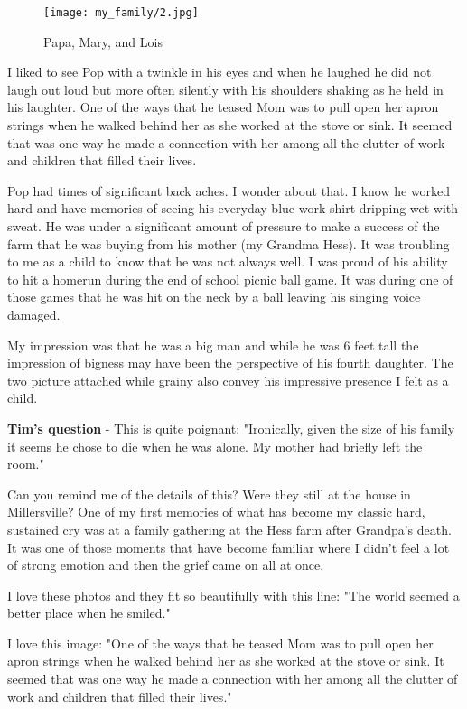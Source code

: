 \begin{figure}
\centering
\texttt{[image: my\_family/2.jpg]}
\caption{Papa, Mary, and Lois}
\end{figure}
I liked to see Pop with a twinkle in his eyes and when he laughed he did not laugh out loud but more often silently with his shoulders shaking as he held in his laughter.
One of the ways that he teased Mom was to pull open her apron strings when he walked behind her as she worked at the stove or sink.
It seemed that was one way he made a connection with her among all the clutter of work and children that filled their lives.

Pop had times of significant back aches.
I wonder about that.
I know he worked hard and have memories of seeing his everyday blue work shirt dripping wet with sweat.
He was under a significant amount of pressure to make a success of the farm that he was buying from his mother (my Grandma Hess).
It was troubling to me as a child to know that he was not always well.
I was proud of his ability to hit a homerun during the end of school picnic ball game.
It was during one of those games that he was hit on the neck by a ball leaving his singing voice damaged.

My impression was that he was a big man and while he was 6 feet tall the impression of bigness may have been the perspective of his fourth daughter.
The two picture attached while grainy also convey his impressive presence I felt as a child.

\textbf{Tim's question} - This is quite poignant: "Ironically, given the size of his family it seems he chose to die when he was alone.
My mother had briefly left the room."

Can you remind me of the details of this? Were they still at the house in Millersville? One of my first memories of what has become my classic hard, sustained cry was at a family gathering at the Hess farm after Grandpa's death.
It was one of those moments that have become familiar where I didn't feel a lot of strong emotion and then the grief came on all at once.

I love these photos and they fit so beautifully with this line: "The world seemed a better place when he smiled."

I love this image: "One of the ways that he teased Mom was to pull open her apron strings when he walked behind her as she worked at the stove or sink.
It seemed that was one way he made a connection with her among all the clutter of work and children that filled their lives."

